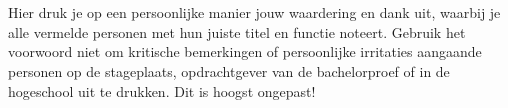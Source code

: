 

\chapter*{}%
\label{ch:voorwoord}

Hier druk je op een persoonlijke manier jouw waardering en dank uit, waarbij je alle vermelde personen met hun juiste titel en functie noteert. Gebruik het voorwoord niet om kritische bemerkingen of persoonlijke irritaties aangaande personen op de stageplaats, opdrachtgever van de bachelorproef of in de hogeschool uit te drukken. Dit is hoogst ongepast!


